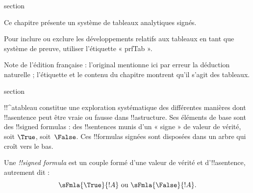 \documentclass[11pt,a4paper,openany]{memoir}
\begin{document}
\endgroup



\OLEndChapterHook


\endgroup


\begingroup
\expandafter\def\csname ol@sectioncs\endcsname{section}
\def\olfilename{tableaux}


      {}
      {}

\begin{editorial}
Ce chapitre présente un système de tableaux analytiques signés.
  
Pour inclure ou exclure les développements relatifs aux tableaux en
tant que système de preuve, utiliser l'étiquette « prfTab ».

Note de l'édition française : l'original mentionne ici par erreur
la déduction naturelle ; l'étiquette et le contenu du chapitre montrent
qu'il s'agit des tableaux.
\end{editorial}


\begingroup
\expandafter\def\csname ol@sectioncs\endcsname{section}
\def\olfilename{rules-and-proofs}


      {}
      {}


!!^a{tableau} constitue une exploration systématique des différentes
manières dont !!a{sentence} peut être vraie ou fausse dans
!!a{structure}. Ses éléments de base sont des !!{signed formula}s :
des !!{sentence}s munis d'un « signe » de valeur de vérité, soit
$\True$, soit~$\False$. Ces !!{formula}s signées sont disposées dans
un arbre qui croît vers le bas.

\begin{defn}
  Une \emph{!!{signed formula}} est un couple formé d'une valeur de
  vérité et d'!!a{sentence}, autrement dit :
  \[
  \sFmla{\True}{!A} \text{ ou } \sFmla{\False}{!A}.
  \]
\end{defn}
\end{document}
